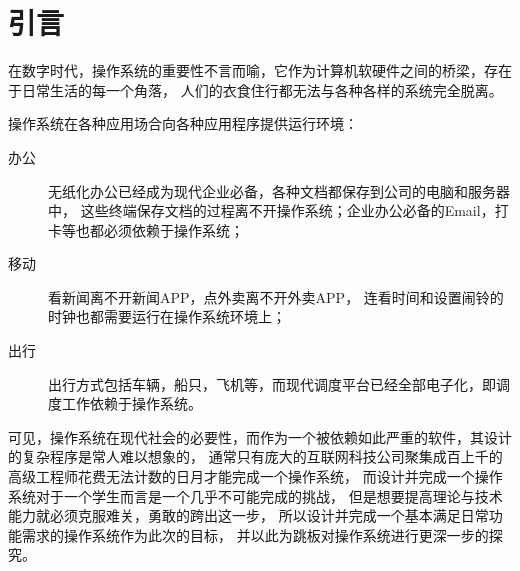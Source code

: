 \chapter{引言}
在数字时代，操作系统的重要性不言而喻，它作为计算机软硬件之间的桥梁，存在于日常生活的每一个角落，
人们的衣食住行都无法与各种各样的系统完全脱离。

操作系统在各种应用场合向各种应用程序提供运行环境：
\begin{description}
    \item [办公] 无纸化办公已经成为现代企业必备，各种文档都保存到公司的电脑和服务器中，
    这些终端保存文档的过程离不开操作系统；企业办公必备的Email，打卡等也都必须依赖于操作系统；
    \item [移动] 看新闻离不开新闻APP，点外卖离不开外卖APP，
    连看时间和设置闹铃的时钟也都需要运行在操作系统环境上；
    \item [出行] 出行方式包括车辆，船只，飞机等，而现代调度平台已经全部电子化，即调度工作依赖于操作系统。
\end{description}

可见，操作系统在现代社会的必要性，而作为一个被依赖如此严重的软件，其设计的复杂程序是常人难以想象的，
通常只有庞大的互联网科技公司聚集成百上千的高级工程师花费无法计数的日月才能完成一个操作系统，
而设计并完成一个操作系统对于一个学生而言是一个几乎不可能完成的挑战，
但是想要提高理论与技术能力就必须克服难关，勇敢的跨出这一步，
所以设计并完成一个基本满足日常功能需求的操作系统作为此次的目标，
并以此为跳板对操作系统进行更深一步的探究。